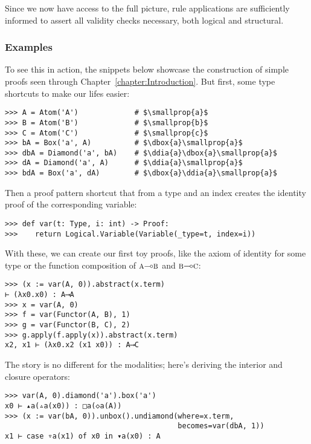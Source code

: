 \noindent Since we now have access to the full picture, rule applications are sufficiently informed to assert all validity checks necessary, both logical and structural.

\subsubsection{Examples}
To see this in action, the snippets below showcase the construction of simple proofs seen through Chapter~\ref{chapter:Introduction}.
But first, some type shortcuts to make our lifes easier:

\begin{verbatim}
>>> A = Atom('A')             # $\smallprop{a}$
>>> B = Atom('B')             # $\smallprop{b}$
>>> C = Atom('C')             # $\smallprop{c}$
>>> bA = Box('a', A)          # $\dbox{a}\smallprop{a}$
>>> dbA = Diamond('a', bA)    # $\ddia{a}\dbox{a}\smallprop{a}$
>>> dA = Diamond('a', A)      # $\ddia{a}\smallprop{a}$
>>> bdA = Box('a', dA)        # $\dbox{a}\ddia{a}\smallprop{a}$
\end{verbatim}

\noindent Then a proof pattern shortcut that from a type and an index creates the identity proof of the corresponding variable:
\begin{verbatim}
>>> def var(t: Type, i: int) -> Proof:
>>>    return Logical.Variable(Variable(_type=t, index=i))
\end{verbatim}

\noindent With these, we can create our first toy proofs, like the axiom of identity for some type  or the function composition of $\smallprop{a}\li\smallprop{b}$ and $\smallprop{b}\li\smallprop{c}$:
\begin{verbatim}
>>> (x := var(A, 0)).abstract(x.term)
⊢ (λx0.x0) : A⟶A
>>> x = var(A, 0)
>>> f = var(Functor(A, B), 1)
>>> g = var(Functor(B, C), 2)
>>> g.apply(f.apply(x)).abstract(x.term)
x2, x1 ⊢ (λx0.x2 (x1 x0)) : A⟶C
\end{verbatim}

\noindent The story is no different for the modalities; here's deriving the interior and closure operators:
\begin{verbatim}
>>> var(A, 0).diamond('a').box('a')
x0 ⊢ ▴a(▵a(x0)) : □a(◇a(A))
>>> (x := var(bA, 0)).unbox().undiamond(where=x.term, 
                                        becomes=var(dbA, 1))
x1 ⊢ case ▿a(x1) of x0 in ▾a(x0) : A
\end{verbatim}


